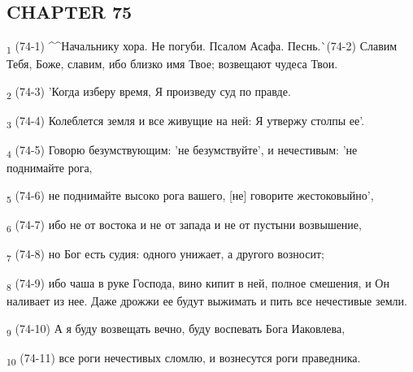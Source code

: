 \subsection{CHAPTER 75}
\begin{tcolorbox}
\textsubscript{1} (74-1) ^^Начальнику хора. Не погуби. Псалом Асафа. Песнь.^^ (74-2) Славим Тебя, Боже, славим, ибо близко имя Твое; возвещают чудеса Твои.
\end{tcolorbox}
\begin{tcolorbox}
\textsubscript{2} (74-3) 'Когда изберу время, Я произведу суд по правде.
\end{tcolorbox}
\begin{tcolorbox}
\textsubscript{3} (74-4) Колеблется земля и все живущие на ней: Я утвержу столпы ее'.
\end{tcolorbox}
\begin{tcolorbox}
\textsubscript{4} (74-5) Говорю безумствующим: 'не безумствуйте', и нечестивым: 'не поднимайте рога,
\end{tcolorbox}
\begin{tcolorbox}
\textsubscript{5} (74-6) не поднимайте высоко рога вашего, [не] говорите жестоковыйно',
\end{tcolorbox}
\begin{tcolorbox}
\textsubscript{6} (74-7) ибо не от востока и не от запада и не от пустыни возвышение,
\end{tcolorbox}
\begin{tcolorbox}
\textsubscript{7} (74-8) но Бог есть судия: одного унижает, а другого возносит;
\end{tcolorbox}
\begin{tcolorbox}
\textsubscript{8} (74-9) ибо чаша в руке Господа, вино кипит в ней, полное смешения, и Он наливает из нее. Даже дрожжи ее будут выжимать и пить все нечестивые земли.
\end{tcolorbox}
\begin{tcolorbox}
\textsubscript{9} (74-10) А я буду возвещать вечно, буду воспевать Бога Иаковлева,
\end{tcolorbox}
\begin{tcolorbox}
\textsubscript{10} (74-11) все роги нечестивых сломлю, и вознесутся роги праведника.
\end{tcolorbox}
